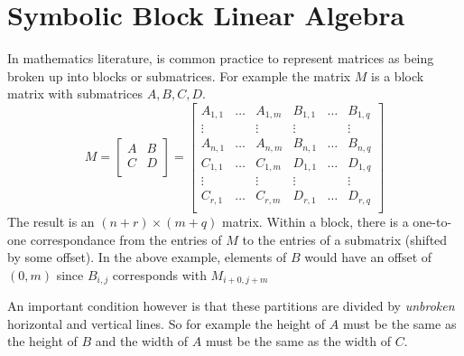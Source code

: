 \chapter{Symbolic Block Linear Algebra}

In mathematics literature, is common practice to represent matrices as being broken up into blocks or submatrices.
For example the matrix $M$ is a block matrix with submatrices $A,B,C,D$.
\begin{equation}
	M= \left[
		\begin{array}{c|c}
			A & B \\
			\hline
			C & D \\
		\end{array}
	\right]
	= \left[
		\begin{array}{ccc|ccc}
			A_{1,1} & \ldots &A_{1,m} & B_{1,1} & \ldots & B_{1,q} \\
			\vdots & & \vdots & \vdots & & \vdots \\
			A_{n, 1} & \ldots & A_{n, m} & B_{n,1} & \ldots & B_{n,q} \\
			\hline
			C_{1, 1} & \ldots & C_{1, m} & D_{1,1} & \ldots & D_{1,q} \\
			\vdots & & \vdots & \vdots & & \vdots \\
			C_{r,1} & \ldots & C_{r,m} & D_{r,1} & \ldots & D_{r,q} \\
		\end{array}
	\right]
\end{equation}
The result is an $(n+r) \times (m+q)$ matrix.
Within a block, there is a one-to-one correspondance from the entries of $M$ to the entries of a submatrix (shifted by some offset).
In the above example, elements of $B$ would have an offset of $(0,m)$ since $B_{i,j}$ corresponds with $M_{i+0, j+m}$

An important condition however is that these partitions are divided by \emph{unbroken} horizontal and vertical lines.
So for example the height of $A$ must be the same as the height of $B$ 
and the width of $A$ must be the same as the width of $C$.


